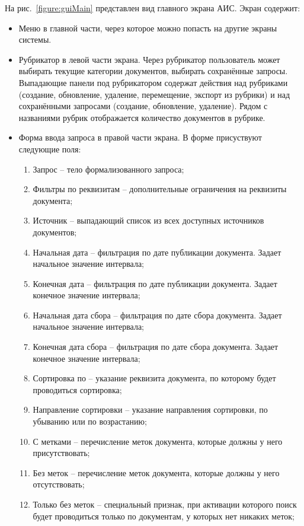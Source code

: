 На рис.~\ref{figure:guiMain} представлен вид главного экрана АИС. Экран содержит:
\begin{itemize}
\item Меню в главной части, через которое можно попасть на другие экраны системы.
\item Рубрикатор в левой части экрана. Через рубрикатор пользователь может выбирать текущие категории документов, выбирать сохранённые запросы. Выпадающие панели под рубрикатором содержат действия над рубриками (создание, обновление, удаление, перемещение, экспорт из рубрики) и над сохранёнными запросами (создание, обновление, удаление). Рядом с названиями рубрик отображается количество документов в рубрике.
\item Форма ввода запроса в правой части экрана. В форме присуствуют следующие поля:
\begin{enumerate}
\item Запрос -- тело формализованного запроса;
\item Фильтры по реквизитам -- дополнительные ограничения на реквизиты документа;
\item Источник -- выпадающий список из всех доступных источников документов;
\item Начальная дата -- фильтрация по дате публикации документа. Задает начальное значение интервала;
\item Конечная дата -- фильтрация по дате публикации документа. Задает конечное значение интервала;
\item Начальная дата сбора -- фильтрация по дате сбора документа. Задает начальное значение интервала;
\item Конечная дата сбора -- фильтрация по дате сбора документа. Задает конечное значение интервала;
\item Сортировка по -- указание реквизита документа, по которому будет проводиться сортировка;
\item Направление сортировки -- указание направления сортировки, по убыванию или по возрастанию;
\item С метками -- перечисление меток документа, которые должны у него присутствовать;
\item Без меток -- перечисление меток документа, которые должны у него отсутствовать;
\item Только без меток -- специальный признак, при активации которого поиск будет проводиться только по документам, у которых нет никаких меток;
\end{enumerate}

\end{itemize}

